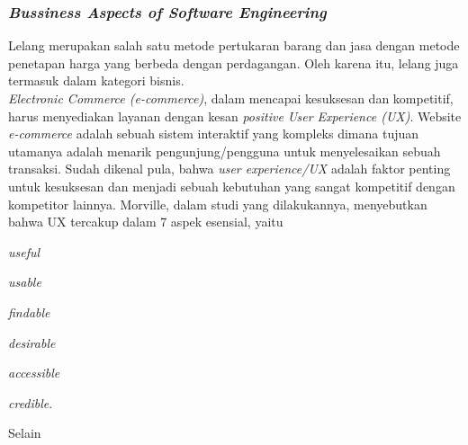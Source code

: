 \subsubsection{\textit{Bussiness Aspects of Software Engineering}}
	
	Lelang merupakan salah satu metode pertukaran barang dan jasa dengan metode penetapan harga yang berbeda dengan perdagangan. Oleh karena itu, lelang juga termasuk dalam kategori bisnis.\\
	\indent \textit{Electronic Commerce (e-commerce)}, dalam mencapai kesuksesan dan kompetitif, harus menyediakan layanan dengan kesan \textit{positive User Experience (UX)}. Website \textit{e-commerce} adalah sebuah sistem interaktif yang kompleks dimana tujuan utamanya adalah menarik pengunjung/pengguna untuk menyelesaikan sebuah transaksi. Sudah dikenal pula, bahwa \textit{user experience/UX} adalah faktor penting untuk kesuksesan dan menjadi sebuah kebutuhan yang sangat kompetitif dengan kompetitor lainnya. Morville, dalam studi yang dilakukannya, menyebutkan bahwa UX tercakup dalam 7 aspek esensial, yaitu \begin{inlinelist}
		\item \textit{useful}
		\item \textit{usable}
		\item \textit{findable}
		\item \textit{desirable}
		\item \textit{accessible}
		\item \textit{credible}.
		\end{inlinelist} \cite[p.~27]{a-set-of-heuristics-2014}
		
	\indent Selain 
		
		
		